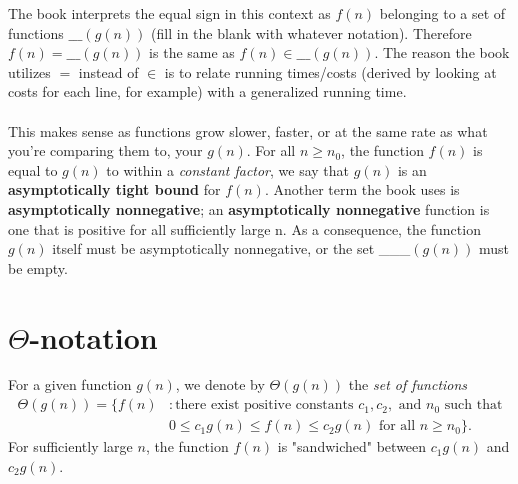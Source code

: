 \documentclass{article}
\begin{document}
\newpage

The book interprets the equal sign in this context as $f(n)$ belonging to a set of functions $\_\_\_(g(n))$ (fill in the blank with whatever notation). Therefore $f(n)=\_\_\_(g(n))$ is the same as $f(n) \in \_\_\_(g(n))$. The reason the book utilizes $=$ instead of $\in$ is to relate running times/costs (derived by looking at costs for each line, for example) with a generalized running time.
\\ \\
This makes sense as functions grow slower, faster, or at the same rate as what you're comparing them to, your $g(n)$. For all $n \geq n_0$, the function $f(n)$ is equal to $g(n)$ to within a \textit{constant factor}, we say that $g(n)$ is an \textbf{asymptotically tight bound} for $f(n)$. Another term the book uses is \textbf{asymptotically nonnegative}; an \textbf{asymptotically nonnegative} function is one that is positive for all sufficiently large n. As a consequence, the function $g(n)$ itself must be asymptotically nonnegative, or the set \_\_\_$(g(n))$ must be empty. 

\newpage

\section*{$\Theta$-notation}
For a given function $g(n)$, we denote by $\Theta{(g(n))}$ the \textit{set of functions}\newline
\begin{equation*}
\begin{split}
\Theta{(g(n))} = \{f(n) & : \text{there exist positive constants } c_1, c_2, \text{ and } n_0 \text{ such that}\\
  & 0 \leq c_1g(n) \leq f(n) \leq c_2g(n) \text{ for all } n \geq n_0\}.
\end{split}
\end{equation*}
For sufficiently large $n$, the function $f(n)$ is "sandwiched" between $c_1g(n)$ and $c_2g(n)$.

\end{document}

